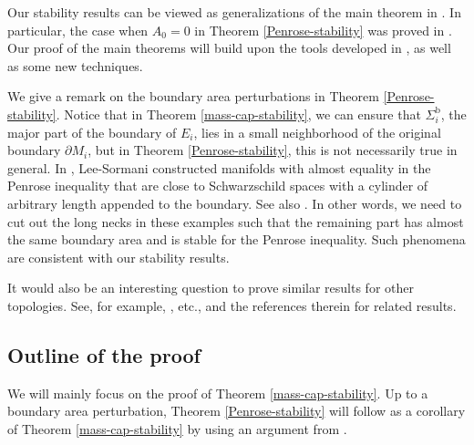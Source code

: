 \documentclass[letter]{amsart}
\theoremstyle{definition}
\theoremstyle{remark}
\begin{document}
Our stability results can be viewed as generalizations of the main theorem in \cite{DS'23}. In particular, the case when $A_0=0$ in Theorem \ref{Penrose-stability} was proved in \cite{DS'23}. Our proof of the main theorems will build upon the tools developed in \cite{DS'23}, as well as some new techniques. 


We give a remark on the boundary area perturbations in Theorem \ref{Penrose-stability}. Notice that in Theorem \ref{mass-cap-stability}, we can ensure that $\Sigma _i^{\mathrm{b}}$, the major part of the boundary of $E_i$, lies in a small neighborhood of the original boundary $\partial M_i$, but in Theorem \ref{Penrose-stability}, this is not necessarily true in general. In \cite[Example 5.2]{LS12}, Lee-Sormani constructed manifolds with almost equality in the Penrose inequality that are close to Schwarzschild spaces with a cylinder of arbitrary length appended to the boundary. See also \cite{ManScho15}. In other words, we need to cut out the long necks in these examples such that the remaining part has almost the same boundary area and is stable for the Penrose inequality. Such phenomena are consistent with our stability results. 

It would also be an interesting question to prove similar results for other topologies. See, for example, \cite{LS12, LS14,LNN20, KKL21, Dong22}, etc., and the references therein for related results. 



\subsection*{Outline of the proof}
We will mainly focus on the proof of Theorem \ref{mass-cap-stability}. Up to a boundary area perturbation, Theorem \ref{Penrose-stability} will follow as a corollary of Theorem \ref{mass-cap-stability} by using an argument from \cite{Bray'01}.
\end{document}

